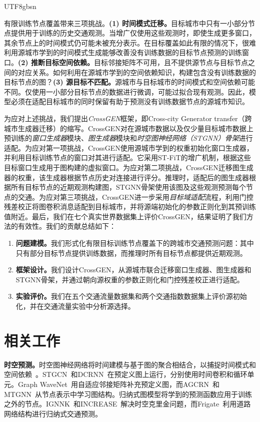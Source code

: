 \documentclass[runningheads,a4paper]{llncs}
\begin{document}
\begin{CJK*}{UTF8}{gbsn}

有限训练节点覆盖带来三项挑战。\textbf{(1) 时间模式迁移。}目标城市中只有一小部分节点提供用于训练的历史交通观测。当增广仅使用这些观测时，即使生成更多窗口，其余节点上的时间模式仍可能未被充分表示。在目标覆盖如此有限的情况下，很难利用源城市学到的时间模式生成能够改善没有训练数据的目标节点预测的训练窗口。\textbf{(2) 推断目标空间依赖。}目标邻接矩阵不可用，且不提供源节点与目标节点之间的对应关系。如何利用在源城市学到的空间依赖知识，构建包含没有训练数据的目标节点的图？\textbf{(3) 源目标不匹配。}源城市与目标城市的时间模式和空间依赖可能不同。仅使用一小部分目标节点的数据进行微调，可能过拟合现有观测。因此，模型必须在适配目标城市的同时保留有助于预测没有训练数据节点的源城市知识。

为应对上述挑战，我们提出\emph{CrossGEN}框架，即Cross-city Generator transfer（跨城市生成器迁移）的缩写。CrossGEN对在源城市数据以及仅少量目标城市数据上预训练的\emph{窗口生成器}模块、\emph{图生成器}模块和\emph{时空图神经网络（STGNN）骨架}进行适配。为应对第一项挑战，CrossGEN使用源城市学到的权重初始化窗口生成器，并利用目标训练节点的窗口对其进行适配。它采用ST-FiT的增广机制，根据这些目标窗口生成用于图构建的虚拟窗口。为应对第二项挑战，CrossGEN迁移图生成器的权重，该生成器根据节点历史对连接进行评分。推理时，适配后的图生成器根据所有目标节点的近期观测构建图，STGNN骨架使用该图及这些观测预测每个节点的交通。为应对第三项挑战，CrossGEN进一步采用\emph{目标域适配}流程，利用门控残差校正将图卷积消息适配到目标城市，并将源端初始化的参数正则化到其预训练值附近。最后，我们在七个真实世界数据集上评价CrossGEN，结果证明了我们方法的有效性。我们的贡献总结如下：
\begin{enumerate}
\item \textbf{问题建模。}我们形式化有限目标训练节点覆盖下的跨城市交通预测问题：其中只有部分目标节点提供训练数据，而推理时所有目标节点都提供近期观测。
\item \textbf{框架设计。}我们设计CrossGEN，从源城市联合迁移窗口生成器、图生成器和STGNN骨架，并通过朝向源权重的参数正则化和门控残差校正进行适配。
\item \textbf{实验评价。}我们在五个交通流量数据集和两个交通指数数据集上评价源初始化，并在交通流量实验中分析源选择。
\end{enumerate}

\section{相关工作}\label{sec:related}

\noindent\textbf{时空预测。}时空图神经网络将时间建模与基于图的聚合相结合，以捕捉时间模式和空间依赖~\cite{stsurvey}。STGCN~\cite{stgcn}和DCRNN~\cite{dcrnn}在预定义图上运行，分别使用时间卷积和循环单元。Graph WaveNet~\cite{graphwavenet}用自适应邻接矩阵补充预定义图，而AGCRN~\cite{agcrn}和MTGNN~\cite{mtgnn}从节点表示中学习图结构。归纳式图模型将学到的预测函数应用于训练之外的节点。IGNNK~\cite{ignnk}和INCREASE~\cite{increase}解决时空克里金问题，而Frigate~\cite{frigate}利用道路网络结构进行归纳式交通预测。


\end{CJK*}
\end{document}
